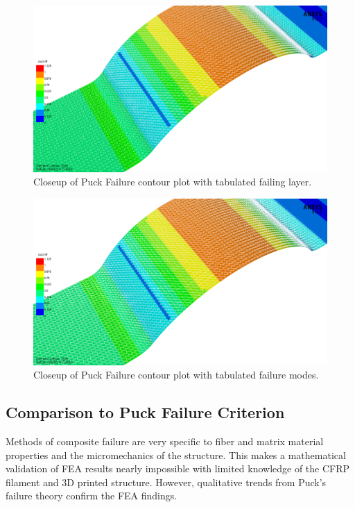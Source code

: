 \begin{figure}[htp]
\centering
\includegraphics[width=1\textwidth]{./figures/fea/fea-acp-pfailure-layer-closeup}
\caption{Closeup of Puck Failure contour plot with tabulated failing layer.}
\label{fig:fea-acp-pfailure-layer-closeup}
\end{figure}

\begin{figure}[htp]
\centering
\includegraphics[width=1\textwidth]{./figures/fea/fea-acp-pfailure-mode-closeup}
\caption{Closeup of Puck Failure contour plot with tabulated failure modes.}
\label{fig:fea-acp-pfailure-mode-closeup}
\end{figure}

\clearpage

\subsection{Comparison to Puck Failure Criterion}

\indent

Methods of composite failure are very specific to fiber and matrix material properties and the micromechanics of the structure. This makes a mathematical validation of FEA results nearly impossible with limited knowledge of the CFRP filament and 3D printed structure. However, qualitative trends from Puck's failure theory confirm the FEA findings.\\

